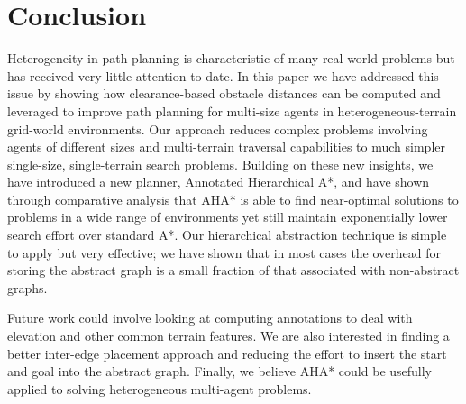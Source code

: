 \section{Conclusion} 
Heterogeneity in path planning is characteristic of many real-world problems but has received very little attention to date.
In this paper we have addressed this issue by showing how clearance-based obstacle distances can be computed and leveraged to improve path planning for multi-size agents in heterogeneous-terrain grid-world environments. 
Our approach reduces complex problems involving agents of different sizes and multi-terrain traversal capabilities to much simpler single-size, single-terrain search problems.
Building on these new insights, we have introduced a new planner, Annotated Hierarchical A*,  and have shown through comparative analysis that AHA* is able to find near-optimal solutions to problems in a wide range of environments yet still maintain exponentially lower search effort over standard A*.
Our hierarchical abstraction technique is simple to apply but very effective; we have shown that in most cases the overhead for storing the abstract graph is a small fraction of that associated with non-abstract graphs.
\par \indent
Future work could involve looking at computing annotations to deal with elevation and other common terrain features. 
We are also interested in finding a better inter-edge placement approach and reducing the effort to insert the start and goal into the abstract graph.
Finally, we believe AHA* could be usefully applied to solving heterogeneous multi-agent problems.
